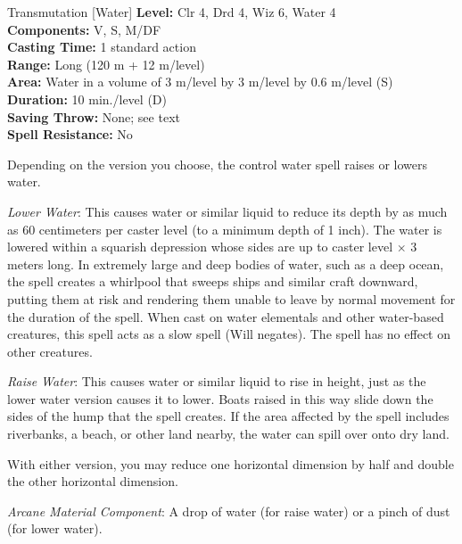 {Transmutation [Water]}
{
	\textbf{Level:}
	Clr 4, Drd 4, Wiz 6, Water 4\\
	\textbf{Components:}
	V, S, M/DF\\
	\textbf{Casting Time:}
	1 standard action\\
	\textbf{Range:}
	Long (120 m + 12 m/level)\\
	\textbf{Area:}
	Water in a volume of 3 m/level by 3 m/level by 0.6 m/level (S)\\
	\textbf{Duration:}
	10 min./level (D)\\
	\textbf{Saving Throw:}
	None; see text\\
	\textbf{Spell Resistance:}
	No\\
}
{
	Depending on the version you choose, the control water spell raises or lowers water.

	\textit{Lower Water}:
	This causes water or similar liquid to reduce its depth by as much as 60 centimeters per caster level (to a minimum depth of 1 inch). The water is lowered within a squarish depression whose sides are up to caster level $\times$ 3 meters long. In extremely large and deep bodies of water, such as a deep ocean, the spell creates a whirlpool that sweeps ships and similar craft downward, putting them at risk and rendering them unable to leave by normal movement for the duration of the spell. When cast on water elementals and other water-based creatures, this spell acts as a slow spell (Will negates). The spell has no effect on other creatures.

	\textit{Raise Water}:
	This causes water or similar liquid to rise in height, just as the lower water version causes it to lower. Boats raised in this way slide down the sides of the hump that the spell creates. If the area affected by the spell includes riverbanks, a beach, or other land nearby, the water can spill over onto dry land.

	With either version, you may reduce one horizontal dimension by half and double the other horizontal dimension.

	\textit{Arcane Material Component}:
	A drop of water (for raise water) or a pinch of dust (for lower water).

}
